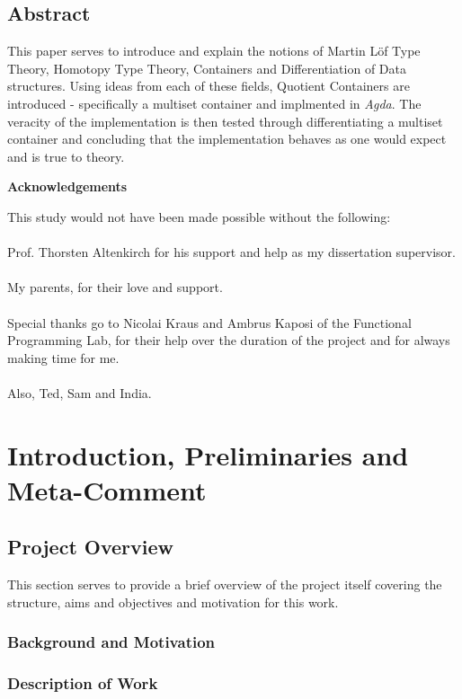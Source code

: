 \documentclass[12pt]{report}
\begin{document}
\setcounter{chapter}{-1}
\chapter{Abstract}
This paper serves to introduce and explain the notions of Martin L\"of Type Theory, Homotopy Type Theory, Containers and Differentiation of Data structures. Using ideas from each of these fields, Quotient Containers are introduced - specifically a multiset container and implmented in \textit{Agda}. The veracity of the implementation is then tested through differentiating a multiset container and concluding that the implementation behaves as one would expect and is true to theory.

\Huge

\noindent \textbf{Acknowledgements}

\normalsize

This study would not have been made possible without the following:\\
\\
Prof. Thorsten Altenkirch for his support and help as my dissertation supervisor.\\
\\
My parents, for their love and support.\\
\\
Special thanks go to Nicolai Kraus and Ambrus Kaposi of the Functional Programming Lab, for their help over the duration of the project and for always making time for me.\\
\\
Also, Ted, Sam and India.

\part{Introduction, Preliminaries and Meta-Comment}
\chapter{Project Overview}
This section serves to provide a brief overview of the project itself covering the structure, aims and objectives and motivation for this work. 

\section{Background and Motivation}


\section{Description of Work}
\end{document}
